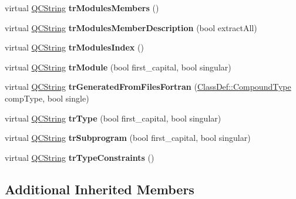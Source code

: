 \begin{DoxyCompactItemize}
virtual \mbox{\hyperlink{class_q_c_string}{Q\+C\+String}} {\bfseries tr\+Modules\+Members} ()
\item 
\mbox{\label{class_translator_adapter__1__5__4_ae531a1c2c29dbaa70739c13ffc1a47a5}} 
virtual \mbox{\hyperlink{class_q_c_string}{Q\+C\+String}} {\bfseries tr\+Modules\+Member\+Description} (bool extract\+All)
\item 
\mbox{\label{class_translator_adapter__1__5__4_a39c7c9db86a64137d740f3dc58c65535}} 
virtual \mbox{\hyperlink{class_q_c_string}{Q\+C\+String}} {\bfseries tr\+Modules\+Index} ()
\item 
\mbox{\label{class_translator_adapter__1__5__4_af1ce7323a98be5e8aebb11a30b71d445}} 
virtual \mbox{\hyperlink{class_q_c_string}{Q\+C\+String}} {\bfseries tr\+Module} (bool first\+\_\+capital, bool singular)
\item 
\mbox{\label{class_translator_adapter__1__5__4_a152b3ffa1ca60f5224841cbda6a77ff5}} 
virtual \mbox{\hyperlink{class_q_c_string}{Q\+C\+String}} {\bfseries tr\+Generated\+From\+Files\+Fortran} (\mbox{\hyperlink{class_class_def_ae70cf86d35fe954a94c566fbcfc87939}{Class\+Def\+::\+Compound\+Type}} comp\+Type, bool single)
\item 
\mbox{\label{class_translator_adapter__1__5__4_a465c9e9c20c66e478880e36bfab5c9ef}} 
virtual \mbox{\hyperlink{class_q_c_string}{Q\+C\+String}} {\bfseries tr\+Type} (bool first\+\_\+capital, bool singular)
\item 
\mbox{\label{class_translator_adapter__1__5__4_ac849925f7653d77a3f58c56b5122be00}} 
virtual \mbox{\hyperlink{class_q_c_string}{Q\+C\+String}} {\bfseries tr\+Subprogram} (bool first\+\_\+capital, bool singular)
\item 
\mbox{\label{class_translator_adapter__1__5__4_ad9f4854c6ec3415c56b39e9e743dd455}} 
virtual \mbox{\hyperlink{class_q_c_string}{Q\+C\+String}} {\bfseries tr\+Type\+Constraints} ()
\end{DoxyCompactItemize}
\subsection*{Additional Inherited Members}


